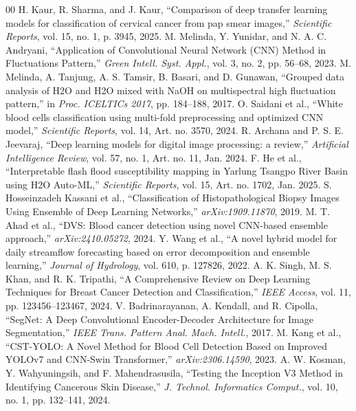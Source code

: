 \documentclass[conference]{IEEEtran}
\begin{document}
\begin{thebibliography}{00}
 H. Kaur, R. Sharma, and J. Kaur, ``Comparison of deep transfer learning models for classification of cervical cancer from pap smear images,'' \emph{Scientific Reports}, vol. 15, no. 1, p. 3945, 2025.
 M. Melinda, Y. Yunidar, and N. A. C. Andryani, ``Application of Convolutional Neural Network (CNN) Method in Fluctuations Pattern,'' \emph{Green Intell. Syst. Appl.}, vol. 3, no. 2, pp. 56--68, 2023.
 M. Melinda, A. Tanjung, A. S. Tamsir, B. Basari, and D. Gunawan, ``Grouped data analysis of H2O and H2O mixed with NaOH on multispectral high fluctuation pattern,'' in \emph{Proc. ICELTICs 2017}, pp. 184--188, 2017.
 O. Saidani et al., ``White blood cells classification using multi-fold preprocessing and optimized CNN model,'' \emph{Scientific Reports}, vol. 14, Art. no. 3570, 2024.
 R. Archana and P. S. E. Jeevaraj, ``Deep learning models for digital image processing: a review,'' \emph{Artificial Intelligence Review}, vol. 57, no. 1, Art. no. 11, Jan. 2024.
 F. He et al., ``Interpretable flash flood susceptibility mapping in Yarlung Tsangpo River Basin using H2O Auto-ML,'' \emph{Scientific Reports}, vol. 15, Art. no. 1702, Jan. 2025.
 S. Hosseinzadeh Kassani et al., ``Classification of Histopathological Biopsy Images Using Ensemble of Deep Learning Networks,'' \emph{arXiv:1909.11870}, 2019.
 M. T. Ahad et al., ``DVS: Blood cancer detection using novel CNN-based ensemble approach,'' \emph{arXiv:2410.05272}, 2024.
 Y. Wang et al., ``A novel hybrid model for daily streamflow forecasting based on error decomposition and ensemble learning,'' \emph{Journal of Hydrology}, vol. 610, p. 127826, 2022.
 A. K. Singh, M. S. Khan, and R. K. Tripathi, ``A Comprehensive Review on Deep Learning Techniques for Breast Cancer Detection and Classification,'' \emph{IEEE Access}, vol. 11, pp. 123456--123467, 2024.
 V. Badrinarayanan, A. Kendall, and R. Cipolla, ``SegNet: A Deep Convolutional Encoder-Decoder Architecture for Image Segmentation,'' \emph{IEEE Trans. Pattern Anal. Mach. Intell.}, 2017.
 M. Kang et al., ``CST-YOLO: A Novel Method for Blood Cell Detection Based on Improved YOLOv7 and CNN-Swin Transformer,'' \emph{arXiv:2306.14590}, 2023.
 A. W. Kosman, Y. Wahyuningsih, and F. Mahendrasusila, ``Testing the Inception V3 Method in Identifying Cancerous Skin Disease,'' \emph{J. Technol. Informatics Comput.}, vol. 10, no. 1, pp. 132--141, 2024.

\end{thebibliography}
\end{document}
